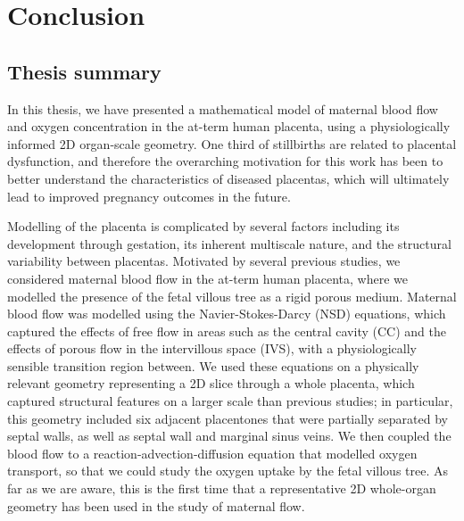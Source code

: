 \chapter{Conclusion} \label{sec:conclusions}    
    \section{Thesis summary}    
        In this thesis, we have presented a mathematical model of maternal blood flow and oxygen concentration in the at-term human placenta, using a physiologically informed 2D organ-scale geometry. One third of stillbirths are related to placental dysfunction, and therefore the overarching motivation for this work has been to better understand the characteristics of diseased placentas, which will ultimately lead to improved pregnancy outcomes in the future.

        Modelling of the placenta is complicated by several factors including its development through gestation, its inherent multiscale nature, and the structural variability between placentas. Motivated by several previous studies, we considered maternal blood flow in the at-term human placenta, where we modelled the presence of the fetal villous tree as a rigid porous medium. Maternal blood flow was modelled using the Navier-Stokes-Darcy (NSD) equations, which captured the effects of free flow in areas such as the central cavity (CC) and the effects of porous flow in the intervillous space (IVS), with a physiologically sensible transition region between. We used these equations on a physically relevant geometry representing a 2D slice through a whole placenta, which captured structural features on a larger scale than previous studies; in particular, this geometry included six adjacent placentones that were partially separated by septal walls, as well as septal wall and marginal sinus veins. We then coupled the blood flow to a reaction-advection-diffusion equation that modelled oxygen transport, so that we could study the oxygen uptake by the fetal villous tree. As far as we are aware, this is the first time that a representative 2D whole-organ geometry has been used in the study of maternal flow.

